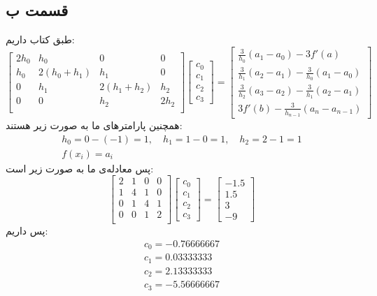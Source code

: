 \documentclass[]{article}
\begin{document}
\subsection*{قسمت ب}
طبق کتاب داریم:
\[
\begin{bmatrix}
    2h_0 & h_0 & 0 & 0 \\
    h_0 & 2(h_0+h_1) & h_1 & 0 \\
    0 & h_1 & 2(h_1+h_2) & h_2\\
    0 & 0 & h_2 & 2h_2 \\
\end{bmatrix}
\begin{bmatrix}
    c_0\\
    c_1\\
    c_2\\
    c_3
\end{bmatrix}
=
\begin{bmatrix}
    \frac{3}{h_0} (a_1 - a_0) - 3f'(a)\\
    \frac{3}{h_1}(a_2 - a_1) - \frac{3}{h_0}(a_1 - a_0)\\
    \frac{3}{h_2}(a_3 - a_2) - \frac{3}{h_1}(a_2 - a_1)\\
    3f'(b) - \frac{3}{h_{n-1}} (a_n - a_{n-1})
\end{bmatrix}
\]
همچنین پارامتر‌های ما به صورت زیر هستند:
\begin{gather*}
    h_0 = 0 - (-1) = 1, \quad h_1 = 1 - 0 = 1, \quad h_2 = 2 - 1 = 1\\
    f(x_i) = a_i
\end{gather*}
پس معادله‌ی ما به صورت زیر است:
\[
\begin{bmatrix}
    2 & 1 & 0 & 0 \\
    1 & 4 & 1 & 0 \\
    0 & 1 & 4 & 1\\
    0 & 0 & 1 & 2 \\
\end{bmatrix}
\begin{bmatrix}
    c_0\\
    c_1\\
    c_2\\
    c_3
\end{bmatrix}
=
\begin{bmatrix}
    -1.5\\
    1.5\\
    3\\
    -9
\end{bmatrix}
\]
پس داریم:
\begin{gather*}
    c_0 = -0.76666667\\
    c_1 = 0.03333333\\
    c_2 = 2.13333333\\
    c_3 = -5.56666667
\end{gather*}
\end{document}
